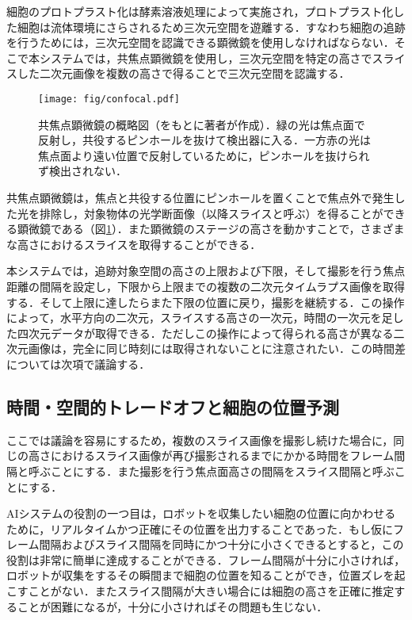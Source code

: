     細胞のプロトプラスト化は酵素溶液処理によって実施され，プロトプラスト化した細胞は流体環境にさらされるため三次元空間を遊離する．すなわち細胞の追跡を行うためには，三次元空間を認識できる顕微鏡を使用しなければならない．そこで本システムでは，共焦点顕微鏡\cite{paddock2000principles}を使用し，三次元空間を特定の高さでスライスした二次元画像を複数の高さで得ることで三次元空間を認識する．

    \begin{figure}[t]
        \centering
        \texttt{[image: fig/confocal.pdf]}
        \caption[共焦点顕微鏡の概略図]{共焦点顕微鏡の概略図（\cite{paddock2000principles}をもとに著者が作成）．緑の光は焦点面で反射し，共役するピンホールを抜けて検出器に入る．一方赤の光は焦点面より遠い位置で反射しているために，ピンホールを抜けられず検出されない．}
        \label{fig:confocal_microscope}
    \end{figure}

    共焦点顕微鏡は，焦点と共役する位置にピンホールを置くことで焦点外で発生した光を排除し，対象物体の光学断面像（以降スライスと呼ぶ）を得ることができる顕微鏡である（図\ref{fig:confocal_microscope}）．また顕微鏡のステージの高さを動かすことで，さまざまな高さにおけるスライスを取得することができる．

    本システムでは，追跡対象空間の高さの上限および下限，そして撮影を行う焦点距離の間隔を設定し，下限から上限までの複数の二次元タイムラプス画像を取得する．そして上限に達したらまた下限の位置に戻り，撮影を継続する．この操作によって，水平方向の二次元，スライスする高さの一次元，時間の一次元を足した四次元データが取得できる．ただしこの操作によって得られる高さが異なる二次元画像は，完全に同じ時刻には取得されないことに注意されたい．この時間差については次項で議論する．

    \subsection{時間・空間的トレードオフと細胞の位置予測}

    ここでは議論を容易にするため，複数のスライス画像を撮影し続けた場合に，同じの高さにおけるスライス画像が再び撮影されるまでにかかる時間をフレーム間隔と呼ぶことにする．また撮影を行う焦点面高さの間隔をスライス間隔と呼ぶことにする．

    AIシステムの役割の一つ目は，ロボットを収集したい細胞の位置に向かわせるために，リアルタイムかつ正確にその位置を出力することであった．もし仮にフレーム間隔およびスライス間隔を同時にかつ十分に小さくできるとすると，この役割は非常に簡単に達成することができる．フレーム間隔が十分に小さければ，ロボットが収集をするその瞬間まで細胞の位置を知ることができ，位置ズレを起こすことがない．またスライス間隔が大きい場合には細胞の高さを正確に推定することが困難になるが，十分に小さければその問題も生じない．

